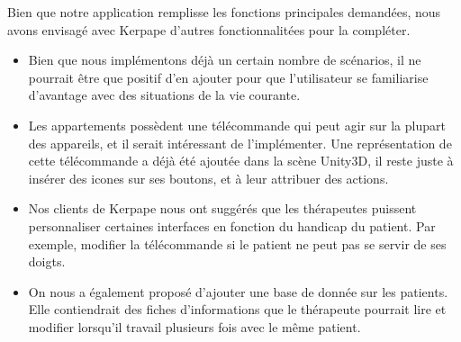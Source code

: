 Bien que notre application remplisse les fonctions principales demandées, nous avons envisagé avec Kerpape d'autres fonctionnalitées pour la compléter.
\begin{itemize}
\item Bien que nous implémentons déjà un certain nombre de scénarios, il ne pourrait être que positif d'en ajouter pour que l'utilisateur se familiarise d'avantage avec des situations de la vie courante.
\item Les appartements possèdent une télécommande qui peut agir sur la plupart des appareils, et il serait intéressant de l'implémenter. Une représentation de cette télécommande a déjà été ajoutée dans la scène Unity3D, il reste juste à insérer des icones sur ses boutons, et à leur attribuer des actions.
\item Nos clients de Kerpape nous ont suggérés que les thérapeutes puissent personnaliser certaines interfaces en fonction du handicap du patient. Par exemple, modifier la télécommande si le patient ne peut pas se servir de ses doigts.
\item On nous a également proposé d'ajouter une base de donnée sur les patients. Elle contiendrait des fiches d'informations que le thérapeute pourrait lire et modifier lorsqu'il travail plusieurs fois avec le même patient.
\end{itemize}
